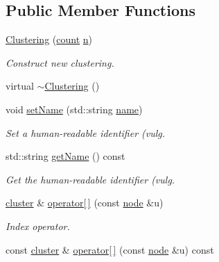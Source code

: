 \subsection*{Public Member Functions}
\begin{DoxyCompactItemize}
\item 
\hyperlink{class_ensemble_clustering_1_1_clustering_ad1851ed55e02294c6ed7f621d5f6e0fc}{Clustering} (\hyperlink{namespace_ensemble_clustering_a2482e94ca22a0c6544a5a9173186fde8}{count} \hyperlink{class_ensemble_clustering_1_1_index_map_a3151d302c54e6ad0175bd87aef62d4ca}{n})
\begin{DoxyCompactList}\small\item\em Construct new clustering. \end{DoxyCompactList}\item 
virtual \hyperlink{class_ensemble_clustering_1_1_clustering_ad7d81b7dc44d96c4802e1294e3ffbb48}{$\sim$\-Clustering} ()
\item 
void \hyperlink{class_ensemble_clustering_1_1_clustering_a983184e9efa473931ae7dfc9c566e666}{set\-Name} (std\-::string \hyperlink{class_ensemble_clustering_1_1_clustering_affe0177a3d80ddd03d475307a74b3a1c}{name})
\begin{DoxyCompactList}\small\item\em Set a human-\/readable identifier (vulg. \end{DoxyCompactList}\item 
std\-::string \hyperlink{class_ensemble_clustering_1_1_clustering_aaabfd9762ba3381d95e6d2bdcd95c9a9}{get\-Name} () const 
\begin{DoxyCompactList}\small\item\em Get the human-\/readable identifier (vulg. \end{DoxyCompactList}\item 
\hyperlink{namespace_ensemble_clustering_a5ae38234e207add524443be6e597b970}{cluster} \& \hyperlink{class_ensemble_clustering_1_1_clustering_aaa9d16c93e56a4ea1c6bcf7eb302610a}{operator\mbox{[}$\,$\mbox{]}} (const \hyperlink{namespace_ensemble_clustering_ae829290aeccd1a420b17a37fd901f114}{node} \&u)
\begin{DoxyCompactList}\small\item\em Index operator. \end{DoxyCompactList}\item 
const \hyperlink{namespace_ensemble_clustering_a5ae38234e207add524443be6e597b970}{cluster} \& \hyperlink{class_ensemble_clustering_1_1_clustering_aa277d9365e79e8b2f067e8630a29b031}{operator\mbox{[}$\,$\mbox{]}} (const \hyperlink{namespace_ensemble_clustering_ae829290aeccd1a420b17a37fd901f114}{node} \&u) const 

\end{DoxyCompactItemize}
